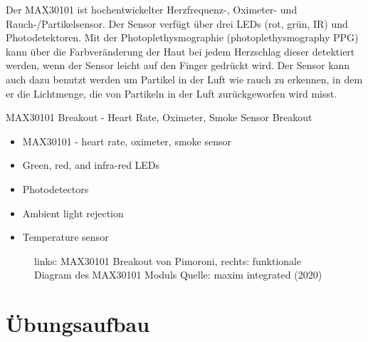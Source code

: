 \documentclass[
  11pt,
  a4paper,
  oneside, openany  ,captions=tableheading
]{scrbook}
\providecommand{\tightlist}{%
  \setlength{\itemsep}{0pt}\setlength{\parskip}{0pt}}
\theoremstyle{remark}
\renewcommand{\markright}[1]{\def\chaptertitle{#1}} %
\begin{document}
\markright{MAX30101 Breakout Heart Rate, Oximeter, Smoke
Sensor\index{MAX30101}}

Der MAX30101 ist hochentwickelter Herzfrequenz-, Oximeter- und
Rauch-/Partikelsensor. Der Sensor verfügt über drei LEDs (rot, grün, IR)
und Photodetektoren. Mit der Photoplethysmographie (photoplethysmography
PPG) kann über die Farbveränderung der Haut bei jedem Herzschlag dieser
detektiert werden, wenn der Sensor leicht auf den Finger gedrückt wird.
Der Sensor kann auch dazu benutzt werden um Partikel in der Luft wie
rauch zu erkennen, in dem er die Lichtmenge, die von Partikeln in der
Luft zurückgeworfen wird misst.

MAX30101 Breakout - Heart Rate, Oximeter, Smoke Sensor Breakout

\begin{itemize}
\tightlist
\item
  MAX30101 - heart rate, oximeter, smoke sensor
\item
  Green, red, and infra-red LEDs
\item
  Photodetectors
\item
  Ambient light rejection
\item
  Temperature sensor
\end{itemize}

\begin{figure}


\caption{\label{fig-MAX30101}links: MAX30101 Breakout von Pimoroni,
rechts: funktionale Diagram des MAX30101 Moduls Quelle: maxim integrated
(2020)}

\end{figure}%

\section*{Übungsaufbau}\label{uxfcbungsaufbau-5}
\end{document}
